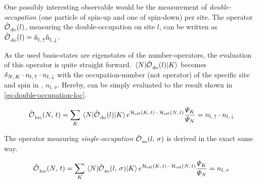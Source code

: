 
One possibly interesting observable would be the measurement of \emph{double-occupation} (one particle of spin-up and one of spin-down) per site. The operator ${\hat{\text{$\mathcal{O}$}}^{ }_{}}_\text{do}(l)$, measuring the double-occupation on site $l$, can be written as ${\hat{\text{$\mathcal{O}$}}^{ }_{}}_\text{do}(l) = \hat{\text{n}}^{ }_{l,\,\uparrow}\hat{\text{n}}^{ }_{l,\,\downarrow}$.

As the used basis-states are eigenstates of the number-operators, the evaluation of this operator is quite straight forward. 
$\bracketHelper{N}{\doubleOccupationOperator{l}}{K}$ becomes $\delta_{N,\,K}\cdot n_{l,\,\uparrow}\cdot n_{l,\,\downarrow}$ with the occupation-number (not operator) of the specific site and spin in \braN, $n_{l,\,\sigma}$. 
Hereby,  can be simply evaluated to the result shown in \autoref{eq:double-occupation-loc}.

\begin{equation}
    \label{eq:double-occupation-loc}
    \localObservable{N}{t} = \lsum[K] \bracketHelper{N}{\doubleOccupationOperator{l}}{K} e^{\HeffOft[K]-\HeffOft[N]}
    \frac{
        \psiN[K]
    }{
        \psiN[N]
    } = n_{l,\,\up}\cdot n_{l,\,\down}
\end{equation}

The operator measuring \emph{single-occupation} ${\hat{\text{$\mathcal{O}$}}^{ }_{}}_\text{so}(l,\,\sigma)$ is derived in the exact same way.

\begin{equation}
    \label{eq:single-occupation-loc}
    \localObservable{N}{t} = \lsum[K] \bracketHelper{N}{\singleOccupationOperator{l}{\sigma}}{K} e^{\HeffOft[K]-\HeffOft[N]}
    \frac{
        \psiN[K]
    }{
        \psiN[N]
    } = n_{l,\,\sigma}
\end{equation}